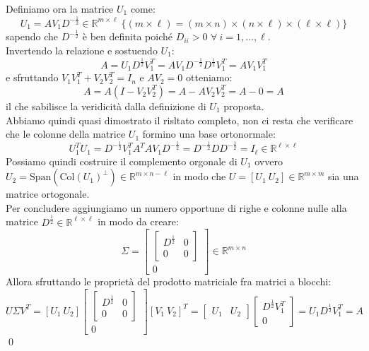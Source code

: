 \documentclass[11pt]{article}
\newcommand{\R}{\mathbb R}
\begin{document}
Definiamo ora la matrice $U_1$ come: $$U_1 = A V_1 D^{-\frac{1}{2}} \in \R^{m \times \ell}\ \lbrace(m \times \ell)=(m \times n)\times(n \times \ell)\times(\ell \times \ell)\rbrace$$ sapendo che $D^{-\frac{1}{2}}$ è ben definita poiché $D_{ii} > 0$ $\forall \ i = 1, \dots, \ell$.\\
Invertendo la relazione e sostuendo $U_1$: $$A=U_1D^{\frac{1}{2}}V_1^T=AV_1D^{-\frac12}D^{\frac12}V_1^T=AV_1V_1^T$$ e sfruttando $V_1V_1^T+V_2V_2^T=I_n$ e $AV_2=0$  otteniamo: $$A=A\left( I -V_2V_2^T \right)=A-AV_2V_2^T=A-0=A$$ il che sabilisce la veridicità dalla definizione di $U_1$ proposta.\\
Abbiamo quindi quasi dimostrato il risltato completo, non ci resta che verificare che le colonne della matrice $U_1$ formino una base ortonormale: $$ U_1^TU_1=D^{-\frac12}V_1^TA^TAV_1D^{-\frac12}=D^{-\frac12}DD^{-\frac12}=I_{\ell} \in \R^{\ell \times \ell} $$
Possiamo quindi costruire il complemento orgonale di $U_1$ ovvero $U_2=\text{Span}(\text{Col}(U_1)^\perp) \in \R^{m \times n-\ell}$ in modo che $U=[U_1 \ U_2] \in \R^{m \times m}$ sia una matrice ortogonale.\\
Per concludere aggiungiamo un numero opportune di righe e colonne nulle alla matrice $D^{\frac12} \in \R^{\ell \times \ell}$ in modo da creare: $$\Sigma=\begin{bmatrix}
  \begin{bmatrix} D^\frac{1}{2} & 0 \\ 0 & 0 \end{bmatrix} \\
  0
\end{bmatrix} \in \R^{m \times n}$$
Allora sfruttando le proprietà del prodotto matriciale fra matrici a blocchi: 
$$U\Sigma V^T= [U_1 \ U_2]\begin{bmatrix}
  \begin{bmatrix} D^\frac{1}{2} & 0 \\ 0 & 0 \end{bmatrix} \\
  0
\end{bmatrix}[V_1 \ V_2]^T= \begin{bmatrix} U_1 & U_2 \end{bmatrix}
\begin{bmatrix} D^\frac{1}{2}V_1^T \\ 0 \end{bmatrix}
= U_1 D^\frac{1}{2} V_1^T = A $$\qed
\end{document}

